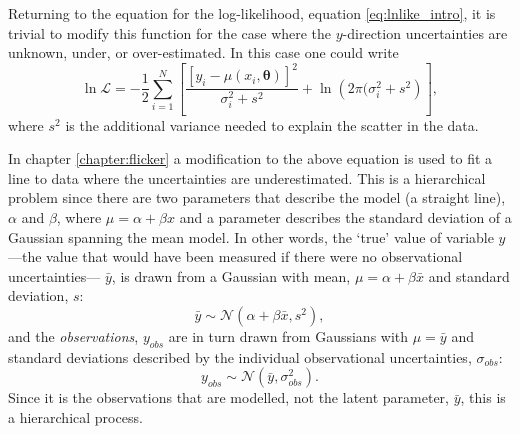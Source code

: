 Returning to the equation for the log-likelihood, equation
\ref{eq:lnlike_intro}, it is trivial to modify this function for the case
where the $y$-direction uncertainties are unknown, under, or over-estimated.
In this case one could write
\begin{equation}
    \ln\mathcal{L} =
    -\frac{1}{2} \sum_{i=1}^N \left[\frac{[y_i - \mu(x_i,
    \mathbf{\theta})]^2}{\sigma_i^2 + s^2} +
    \ln\left(2\pi(\sigma_i^2 + s^2\right) \right],
\end{equation}
where $s^2$ is the additional variance needed to explain the scatter in the
data.

In chapter \ref{chapter:flicker} a modification to the above equation is used
to fit a line to data where the uncertainties are underestimated.
This is a hierarchical problem since there are two parameters that describe
the model (a straight line), $\alpha$ and $\beta$, where $\mu = \alpha +
\beta x$ and a parameter describes the standard deviation of a Gaussian
spanning the mean model.
In other words, the `true' value of variable $y$---the value that would have
been measured if there were no observational uncertainties---
$\bar{y}$, is drawn from a Gaussian with mean, $\mu = \alpha + \beta \bar{x}$
and standard deviation, $s$:
\begin{equation}
\bar{y} \sim \mathcal{N}(\alpha + \beta\bar{x}, s^2),
\end{equation}
and the {\it observations}, $y_{obs}$ are in turn drawn from Gaussians with
$\mu = \bar{y}$ and standard deviations described by the individual
observational uncertainties, $\sigma_{obs}$:
\begin{equation}
y_{obs} \sim \mathcal{N}(\bar{y}, \sigma_{obs}^2).
\end{equation}
Since it is the observations that are modelled, not the latent parameter,
$\bar{y}$, this is a hierarchical process.

